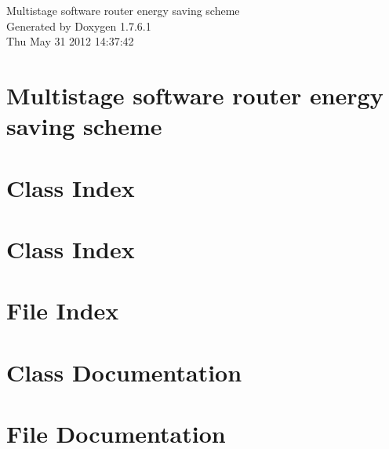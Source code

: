 \documentclass[a4paper]{book}
\begin{document}
\hypersetup{pageanchor=false,citecolor=blue}
\begin{titlepage}
\vspace*{7cm}
\begin{center}
{\Large \-Multistage software router energy saving scheme }\\
\vspace*{1cm}
{\large \-Generated by Doxygen 1.7.6.1}\\
\vspace*{0.5cm}
{\small Thu May 31 2012 14:37:42}\\
\end{center}
\end{titlepage}
\clearemptydoublepage
{}
\tableofcontents
\clearemptydoublepage
{}
\hypersetup{pageanchor=true,citecolor=blue}
\chapter{\-Multistage software router energy saving scheme}
\label{index}\hypertarget{index}{}
\chapter{\-Class \-Index}

\chapter{\-Class \-Index}

\chapter{\-File \-Index}

\chapter{\-Class \-Documentation}










\chapter{\-File \-Documentation}






















\printindex
\end{document}
